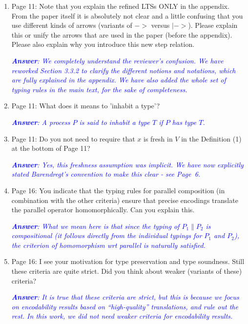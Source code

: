 \documentclass[11pt,a4paper]{article}
\newcommand{\answ}[1]{\smallskip \emph{\textcolor{blue}{\textbf{Answer}:  #1}}}
\newcommand{\checkthis}{}
\begin{document}
\begin{enumerate}
  \answ{Name $t$ is a fresh name. Characteristic processes contain an output on $t$ which is meant to match a corresponding input in the trigger process. We have added the freshness condition in Figure 6. } \checkthis
  
\item Page 11: Note that you explain the refined LTSs ONLY in the appendix. From the
  paper itself it is absolutely not clear and a little confusing that you use
  different kinds of arrows (variants of $->$ versus $|->$). Please explain this or
  unify the arrows that are used in the paper (before the appendix). Please also
  explain why you introduce this new step relation.
  
  \answ{We completely understand the reviewer's confusion. We have reworked Section 3.3.2 to clarify the different notions and notations, which are fully explained in the appendix. We have also added the whole set of typing rules in the main text, for the sake of completeness.} \checkthis
  
\item Page 11: What does it means to 'inhabit a type'?

\answ{A process $P$ is said to inhabit a type $T$ if $P$ has type $T$.}

\item  Page 11: Do you not need to require that $x$ is fresh in $V$ in the Definition (1)
  at the bottom of Page 11?
  
  \answ{Yes, this freshness assumption was implicit. We have now explicitly stated Barendregt's convention to make this clear - see Page~6.}
  
\item  Page 16: You indicate that the typing rules for parallel composition (in
  combination with the other criteria) ensure that precise encodings translate
  the parallel operator homomorphically. Can you explain this.
  
  \answ{What we mean here is that since the typing of $P_1 \parallel P_2$ is compositional (it follows directly from the individual typings for $P_1$ and $P_2$), the criterion of homomorphism wrt parallel is naturally satisfied.}
  
\item  Page 16: I see your motivation for type preservation and type soundness. Still
  these criteria are quite strict. Did you think about weaker (variants of
  these) criteria?
  
  \answ{It is true that these criteria are strict, but this is because we focus on encodability results based on ``high-quality'' translations, and rule out the rest. In this work, we did not need weaker criteria for encodability results.}
  

\end{enumerate}
\end{document}
